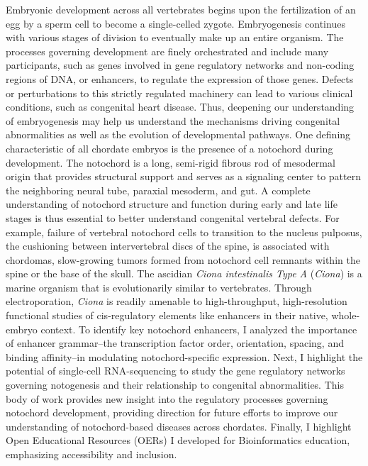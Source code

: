 \documentclass[11pt]{formatting-template}
\begin{document}
\begin{dissertationabstract}
	Embryonic development across all vertebrates begins upon the fertilization of an egg by a sperm cell to become a single-celled zygote. Embryogenesis continues with various stages of division to eventually make up an entire organism. The processes governing development are finely orchestrated and include many participants, such as genes involved in gene regulatory networks and non-coding regions of DNA, or enhancers, to regulate the expression of those genes. Defects or perturbations to this strictly regulated machinery can lead to various clinical conditions, such as congenital heart disease. Thus, deepening our understanding of embryogenesis may help us understand the mechanisms driving congenital abnormalities as well as the evolution of developmental pathways. One defining characteristic of all chordate embryos is the presence of a notochord during development. The notochord is a long, semi-rigid fibrous rod of mesodermal origin that provides structural support and serves as a signaling center to pattern the neighboring neural tube, paraxial mesoderm, and gut. A complete understanding of notochord structure and function during early and late life stages is thus essential to better understand congenital vertebral defects. For example, failure of vertebral notochord cells to transition to the nucleus pulposus, the cushioning between intervertebral discs of the spine, is associated with chordomas, slow-growing tumors formed from notochord cell remnants within the spine or the base of the skull. The ascidian \textit{Ciona intestinalis Type A} (\textit{Ciona}) is a marine organism that is evolutionarily similar to vertebrates. Through electroporation, \textit{Ciona} is readily amenable to high-throughput, high-resolution functional studies of cis-regulatory elements like enhancers in their native, whole-embryo context. To identify key notochord enhancers, I analyzed the importance of enhancer grammar–the transcription factor order, orientation, spacing, and binding affinity–in modulating notochord-specific expression. Next, I highlight the potential of single-cell RNA-sequencing to study the gene regulatory networks governing notogenesis and their relationship to congenital abnormalities. This body of work provides new insight into the regulatory processes governing notochord development, providing direction for future efforts to improve our understanding of notochord-based diseases across chordates. Finally, I highlight Open Educational Resources (OERs) I developed for Bioinformatics education, emphasizing accessibility and inclusion.
\end{dissertationabstract}
\end{document}
